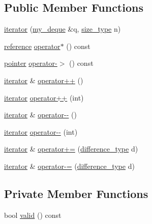 \subsection*{Public Member Functions}
\begin{DoxyCompactItemize}
\item 
\hyperlink{classmy__deque_1_1iterator_a6f8f087ad9d6d0c3f330e9e1461a3bf6}{iterator} (\hyperlink{classmy__deque}{my\-\_\-deque} \&q, \hyperlink{classmy__deque_a61e5e5317fe72a381ce4d45f09544b02}{size\-\_\-type} n)
\item 
\hyperlink{classmy__deque_1_1iterator_ae165ee997a9e18330c593789e9899e57}{reference} \hyperlink{classmy__deque_1_1iterator_a12632f02814bba64ca79f42edc0e1497}{operator$\ast$} () const 
\item 
\hyperlink{classmy__deque_1_1iterator_add0e1ed49072422b5aa0ef52303fb86e}{pointer} \hyperlink{classmy__deque_1_1iterator_a064f5b1faf5a72113083425133de9a41}{operator-\/$>$} () const 
\item 
\hyperlink{classmy__deque_1_1iterator}{iterator} \& \hyperlink{classmy__deque_1_1iterator_ab2a00619614e204eedb184112a56016e}{operator++} ()
\item 
\hyperlink{classmy__deque_1_1iterator}{iterator} \hyperlink{classmy__deque_1_1iterator_a57f6ac4aef7215ca67b6e05eeda29ee4}{operator++} (int)
\item 
\hyperlink{classmy__deque_1_1iterator}{iterator} \& \hyperlink{classmy__deque_1_1iterator_a278cab96c03498e55ba1aa4e05f1538e}{operator-\/-\/} ()
\item 
\hyperlink{classmy__deque_1_1iterator}{iterator} \hyperlink{classmy__deque_1_1iterator_a5bef4b6332aecf7dcda57cee9a1fdc70}{operator-\/-\/} (int)
\item 
\hyperlink{classmy__deque_1_1iterator}{iterator} \& \hyperlink{classmy__deque_1_1iterator_ad17b4f6e8be4d8242ad4572d62beff82}{operator+=} (\hyperlink{classmy__deque_1_1iterator_ac5f62e8566ad92478931c2abd9ac6596}{difference\-\_\-type} d)
\item 
\hyperlink{classmy__deque_1_1iterator}{iterator} \& \hyperlink{classmy__deque_1_1iterator_a13c056d48543734a23a9de09fd652868}{operator-\/=} (\hyperlink{classmy__deque_1_1iterator_ac5f62e8566ad92478931c2abd9ac6596}{difference\-\_\-type} d)
\end{DoxyCompactItemize}
\subsection*{Private Member Functions}
\begin{DoxyCompactItemize}
\item 
bool \hyperlink{classmy__deque_1_1iterator_a4e56b174bbf8c52c58e2f3934be7fc75}{valid} () const 
\end{DoxyCompactItemize}
